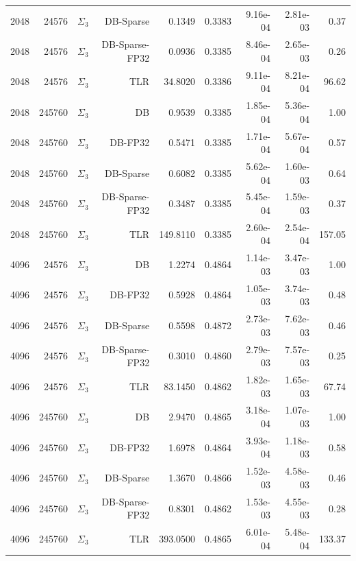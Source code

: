 \begin{tabular}{|r|r|r|r|r|r|r|r|r|}
  2048 & 24576 & $\Sigma_3$ & DB-Sparse & 0.1349 & 0.3383 & 9.16e-04 & 2.81e-03 & 0.37 \\
  2048 & 24576 & $\Sigma_3$ & DB-Sparse-FP32 & 0.0936 & 0.3385 & 8.46e-04 & 2.65e-03 & 0.26 \\
  2048 & 24576 & $\Sigma_3$ & TLR & 34.8020 & 0.3386 & 9.11e-04 & 8.21e-04 & 96.62 \\
  2048 & 245760 & $\Sigma_3$ & DB & 0.9539 & 0.3385 & 1.85e-04 & 5.36e-04 & 1.00 \\
  2048 & 245760 & $\Sigma_3$ & DB-FP32 & 0.5471 & 0.3385 & 1.71e-04 & 5.67e-04 & 0.57 \\
  2048 & 245760 & $\Sigma_3$ & DB-Sparse & 0.6082 & 0.3385 & 5.62e-04 & 1.60e-03 & 0.64 \\
  2048 & 245760 & $\Sigma_3$ & DB-Sparse-FP32 & 0.3487 & 0.3385 & 5.45e-04 & 1.59e-03 & 0.37 \\
  2048 & 245760 & $\Sigma_3$ & TLR & 149.8110 & 0.3385 & 2.60e-04 & 2.54e-04 & 157.05 \\
  4096 & 24576 & $\Sigma_3$ & DB & 1.2274 & 0.4864 & 1.14e-03 & 3.47e-03 & 1.00 \\
  4096 & 24576 & $\Sigma_3$ & DB-FP32 & 0.5928 & 0.4864 & 1.05e-03 & 3.74e-03 & 0.48 \\
  4096 & 24576 & $\Sigma_3$ & DB-Sparse & 0.5598 & 0.4872 & 2.73e-03 & 7.62e-03 & 0.46 \\
  4096 & 24576 & $\Sigma_3$ & DB-Sparse-FP32 & 0.3010 & 0.4860 & 2.79e-03 & 7.57e-03 & 0.25 \\
  4096 & 24576 & $\Sigma_3$ & TLR & 83.1450 & 0.4862 & 1.82e-03 & 1.65e-03 & 67.74 \\
  4096 & 245760 & $\Sigma_3$ & DB & 2.9470 & 0.4865 & 3.18e-04 & 1.07e-03 & 1.00 \\
  4096 & 245760 & $\Sigma_3$ & DB-FP32 & 1.6978 & 0.4864 & 3.93e-04 & 1.18e-03 & 0.58 \\
  4096 & 245760 & $\Sigma_3$ & DB-Sparse & 1.3670 & 0.4866 & 1.52e-03 & 4.58e-03 & 0.46 \\
  4096 & 245760 & $\Sigma_3$ & DB-Sparse-FP32 & 0.8301 & 0.4862 & 1.53e-03 & 4.55e-03 & 0.28 \\
  4096 & 245760 & $\Sigma_3$ & TLR & 393.0500 & 0.4865 & 6.01e-04 & 5.48e-04 & 133.37 \\
  \hline
\end{tabular}
